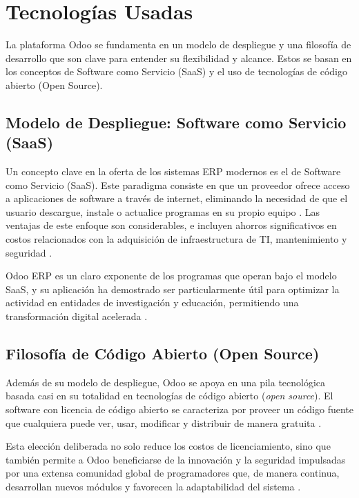 \documentclass[12pt,letterpaper,spanish]{report}
\begin{document}
\section{Tecnologías Usadas}
\label{sec:tecnologias_usadas}
La plataforma Odoo se fundamenta en un modelo de despliegue y una filosofía de desarrollo que son clave para entender su flexibilidad y alcance. Estos se basan en los conceptos de Software como Servicio (SaaS) y el uso de tecnologías de código abierto (Open Source).

\subsection{Modelo de Despliegue: Software como Servicio (SaaS)}

Un concepto clave en la oferta de los sistemas ERP modernos es el de Software como Servicio (SaaS). Este paradigma consiste en que un proveedor ofrece acceso a aplicaciones de software a través de internet, eliminando la necesidad de que el usuario descargue, instale o actualice programas en su propio equipo \cite{dura2022saas}. Las ventajas de este enfoque son considerables, e incluyen ahorros significativos en costos relacionados con la adquisición de infraestructura de TI, mantenimiento y seguridad \cite{dura2022saas}.

Odoo ERP es un claro exponente de los programas que operan bajo el modelo SaaS, y su aplicación ha demostrado ser particularmente útil para optimizar la actividad en entidades de investigación y educación, permitiendo una transformación digital acelerada \cite{dura2022saas}.

\subsection{Filosofía de Código Abierto (Open Source)}

Además de su modelo de despliegue, Odoo se apoya en una pila tecnológica basada casi en su totalidad en tecnologías de código abierto (\textit{open source}). El software con licencia de código abierto se caracteriza por proveer un código fuente que cualquiera puede ver, usar, modificar y distribuir de manera gratuita \cite{pretell2024mejora}.

Esta elección deliberada no solo reduce los costos de licenciamiento, sino que también permite a Odoo beneficiarse de la innovación y la seguridad impulsadas por una extensa comunidad global de programadores que, de manera continua, desarrollan nuevos módulos y favorecen la adaptabilidad del sistema \cite{pretell2024mejora}.
\end{document}
